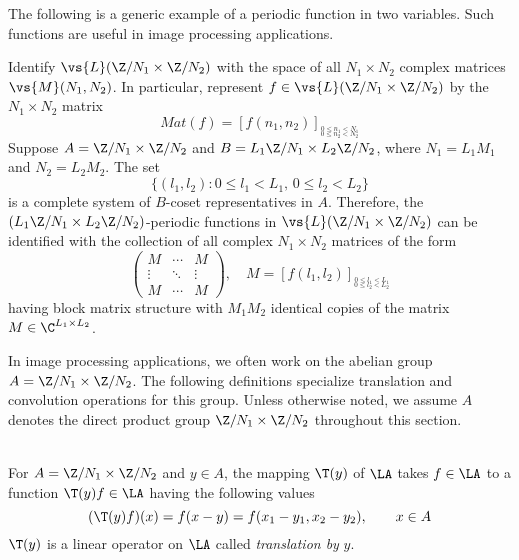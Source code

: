 The following is a generic example of a periodic function in
two variables. Such functions are useful in image processing
applications.
\begin{example}
Identify $\vs{L}(\Z/N_1 \times \Z/N_2)$ with the space of
all $N_1 \times N_2$ complex matrices $\vs{M}(N_1,N_2)$.  
In particular, represent $f\in \vs{L}(\Z/N_1 \times \Z/N_2)$
by the $N_1\times N_2$ matrix 
\[
Mat(f) = 
\left[f(n_1,n_2) \right]_{\stackrel{0\leq n_1 < N_1}
                                 {_{0\leq n_2 < N_2}}}
\]
Suppose $A = \Z/N_1 \times \Z/N_2$ and $B = L_1\Z/N_1 \times L_2\Z/N_2$,
where $N_1 = L_1M_1$ and $N_2 = L_2M_2$.  The set  
\[
\{(l_1,l_2):0\leq l_1 <L_1,\,0\leq l_2 <L_2\}
\]
is a complete system of 
$B$-coset representatives in $A$. %
Therefore, the $(L_1\Z/N_1 \times L_2\Z/N_2)$-periodic
functions in $\vs{L}(\Z/N_1 \times \Z/N_2)$ can be
identified with the collection of all complex 
$N_1 \times N_2$ matrices of the form 
\[
\begin{pmatrix}
M &\cdots &M\\
\vdots &\ddots & \vdots\\
M &\cdots &M
\end{pmatrix}, \quad M =
\left[f(l_1,l_2) \right]_{\stackrel{0\leq l_1 < L_1}
                                 {_{0\leq l_2 < L_2}}}
\]
having block matrix structure with $M_1M_2$ identical copies
of the matrix  $M\in\C^{L_1\times L_2}$. 
\end{example}

In image processing applications, we often work on the
abelian group $A = \Z/N_1 \times \Z/N_2$.  The following
definitions specialize translation and convolution
operations for this group. Unless otherwise noted, we assume
$A$ denotes the direct product group $\Z/N_1 \times \Z/N_2$
throughout this section. 
\begin{definition}[Translation by $y \in A$]\\ %
For $A = \Z/N_1 \times \Z/N_2$ and $y \in A$, the mapping $\T(y)$ of 
$\LA$ %
takes 
$f \in \LA$ %
to a function 
$\T(y)f \in \LA$ %
having the following values
\[
(\T(y)f)(x) = f(x-y) = f(x_1-y_1, x_2-y_2), \qquad x \in 
A %
\]
$\T(y)$ is a linear operator on 
$\LA$ %
called \emph{translation by} $y$.
\end{definition}

